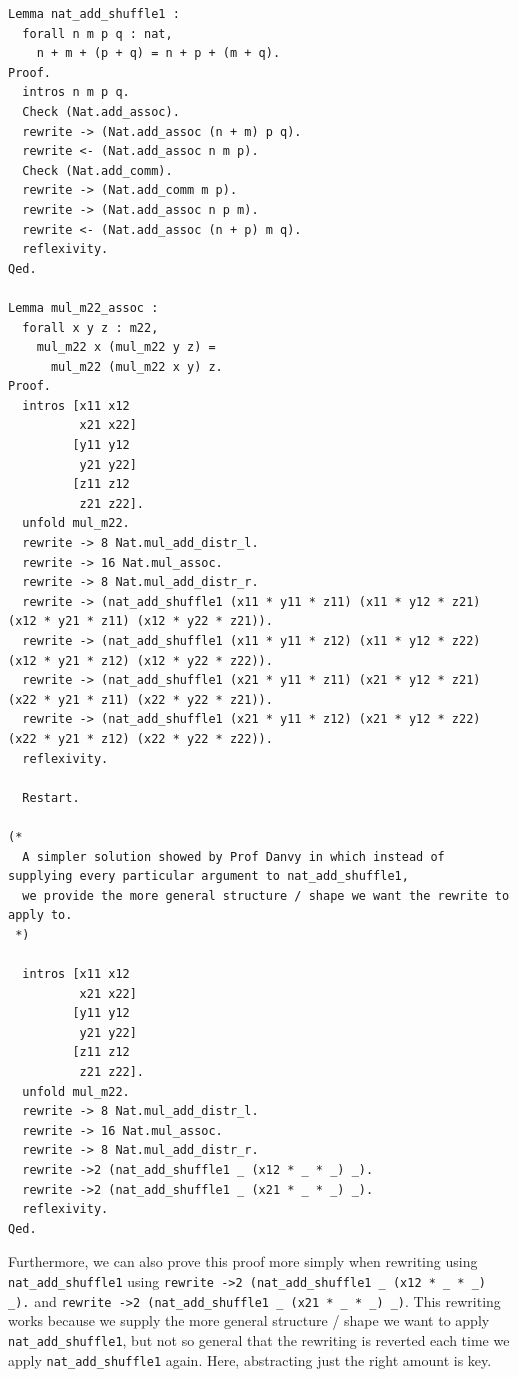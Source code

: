 \documentclass{article}
\begin{document}
\begin{lstlisting}
Lemma nat_add_shuffle1 :
  forall n m p q : nat,
    n + m + (p + q) = n + p + (m + q).
Proof.
  intros n m p q.
  Check (Nat.add_assoc).
  rewrite -> (Nat.add_assoc (n + m) p q).
  rewrite <- (Nat.add_assoc n m p).
  Check (Nat.add_comm).
  rewrite -> (Nat.add_comm m p).
  rewrite -> (Nat.add_assoc n p m).
  rewrite <- (Nat.add_assoc (n + p) m q).
  reflexivity.
Qed.

Lemma mul_m22_assoc :
  forall x y z : m22,
    mul_m22 x (mul_m22 y z) =
      mul_m22 (mul_m22 x y) z.
Proof.
  intros [x11 x12
          x21 x22]
         [y11 y12
          y21 y22]
         [z11 z12
          z21 z22].
  unfold mul_m22.
  rewrite -> 8 Nat.mul_add_distr_l.
  rewrite -> 16 Nat.mul_assoc.
  rewrite -> 8 Nat.mul_add_distr_r.
  rewrite -> (nat_add_shuffle1 (x11 * y11 * z11) (x11 * y12 * z21) (x12 * y21 * z11) (x12 * y22 * z21)).
  rewrite -> (nat_add_shuffle1 (x11 * y11 * z12) (x11 * y12 * z22) (x12 * y21 * z12) (x12 * y22 * z22)).
  rewrite -> (nat_add_shuffle1 (x21 * y11 * z11) (x21 * y12 * z21) (x22 * y21 * z11) (x22 * y22 * z21)).
  rewrite -> (nat_add_shuffle1 (x21 * y11 * z12) (x21 * y12 * z22) (x22 * y21 * z12) (x22 * y22 * z22)).
  reflexivity.

  Restart. 

(*
  A simpler solution showed by Prof Danvy in which instead of supplying every particular argument to nat_add_shuffle1,
  we provide the more general structure / shape we want the rewrite to apply to. 
 *)  

  intros [x11 x12
          x21 x22]
         [y11 y12
          y21 y22]
         [z11 z12
          z21 z22].
  unfold mul_m22.
  rewrite -> 8 Nat.mul_add_distr_l.
  rewrite -> 16 Nat.mul_assoc.
  rewrite -> 8 Nat.mul_add_distr_r.
  rewrite ->2 (nat_add_shuffle1 _ (x12 * _ * _) _).
  rewrite ->2 (nat_add_shuffle1 _ (x21 * _ * _) _).
  reflexivity.
Qed.
\end{lstlisting}

Furthermore, we can also prove this proof more simply when rewriting using \texttt{nat\_add\_shuffle1} using \texttt{rewrite ->2 (nat\_add\_shuffle1 \_ (x12 * \_ * \_) \_).} and \texttt{rewrite ->2 (nat\_add\_shuffle1 \_ (x21 * \_ * \_) \_)}. This rewriting works because we supply the more general structure / shape we want to apply \texttt{nat\_add\_shuffle1}, but not so general that the 
rewriting is reverted each time we apply \texttt{nat\_add\_shuffle1} again. Here, abstracting just the right amount is key. 
\end{document}
